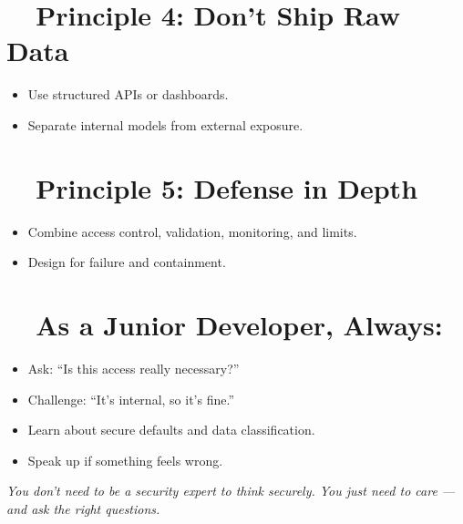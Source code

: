 \documentclass[a4paper,10pt]{article}
\begin{document}
\section*{\faDatabase\ \ Principle 4: Don’t Ship Raw Data}
\begin{tcolorbox}[colback=lightgray, colframe=accentblue, title=Key Ideas]
\begin{itemize}
    \item Use structured APIs or dashboards.
    \item Separate internal models from external exposure.
\end{itemize}
\end{tcolorbox}

\section*{\faShieldAlt\ \ Principle 5: Defense in Depth}
\begin{tcolorbox}[colback=lightgray, colframe=accentblue, title=Key Ideas]
\begin{itemize}
    \item Combine access control, validation, monitoring, and limits.
    \item Design for failure and containment.
\end{itemize}
\end{tcolorbox}

\vspace{1em}
\section*{\faLightbulb\ \ As a Junior Developer, Always:}
\begin{itemize}
    \item Ask: “Is this access really necessary?”
    \item Challenge: “It’s internal, so it’s fine.”
    \item Learn about secure defaults and data classification.
    \item Speak up if something feels wrong.
\end{itemize}

\vfill
\noindent\textit{You don’t need to be a security expert to think securely. You just need to care — and ask the right questions.}
\end{document}
